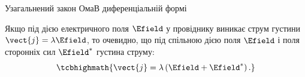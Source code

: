 \documentclass[onlytextwidth]{beamer}
\begin{document}
\begin{frame}{Узагальнений закон Ома}{В диференціальній формі}
	\begin{block}{}\justifying
		Якщо під дією електричного поля $\Efield$  у провіднику виникає струм густини $\vect{j} = \lambda\Efield$, то очевидно, що під спільною дією
		поля $\Efield$
		і поля сторонніх сил $\Efield^*$ густина струму:
		\begin{equation*}
			\tcbhighmath{\vect{j} = \lambda\left(\Efield + \Efield^*\right).}
		\end{equation*}
	\end{block}
\end{frame}
\end{document}
